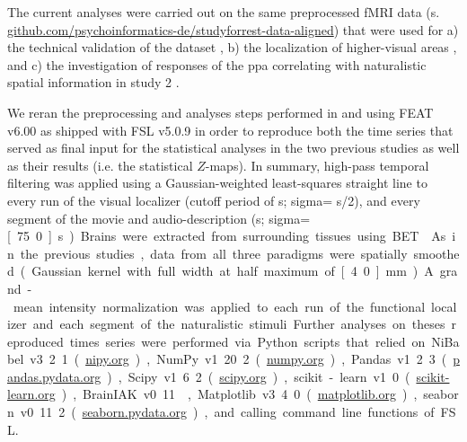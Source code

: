 The current analyses were carried out on the same preprocessed fMRI data (s.
\href{https://github.com/psychoinformatics-de/studyforrest-data-aligned
}{\url{github.com/psychoinformatics-de/studyforrest-data-aligned}}) that were
used for
%
a) the technical validation of the dataset \citep{hanke2016simultaneous},
%
b) the localization of higher-visual areas \citep{sengupta2016extension}, and
%
c) the investigation of responses of the \ac{ppa} correlating with naturalistic
spatial information in study 2 \citep{haeusler2022processing}.

%
We reran the preprocessing and analyses steps performed in
\citet{sengupta2016extension} and \citet{haeusler2022processing} using FEAT
v6.00 \citep[FMRI Expert Analysis Tool;][]{woolrich2001autocorr} as shipped with
FSL v5.0.9 \citep[\href{https://www.fmrib.ox.ac.uk/fsl}{FMRIB's Software
Library;}][]{smith2004fsl} in order to reproduce both the time series that
served as final input for the statistical analyses in the two previous studies
as well as their results (i.e. the statistical $Z$-maps).
In summary, high-pass temporal filtering was applied using a Gaussian-weighted
least-squares straight line to every run of the visual localizer (cutoff period
of \unit[100]{s}; sigma= \unit[100]{s}/2), and every segment of the
movie and audio-description (\unit[150]{s}; sigma=\unit[75.0]{s}).
Brains were extracted from surrounding tissues using BET \citep{smith2002bet}.
As in the previous studies, data from all three paradigms were spatially
smoothed (Gaussian kernel with full width at half maximum of \unit[4.0]{mm}).
A grand-mean intensity normalization was applied to each run of the functional
localizer and each segment of the naturalistic stimuli.

%
Further analyses on theses reproduced times series were performed via Python
scripts that relied on
%
NiBabel v3.2.1 (\href{https://nipy.org}{\url{nipy.org}}),
%
NumPy v1.20.2 (\href{https://numpy.org}{\url{numpy.org}}),
%
Pandas v1.2.3 (\href{https://pandas.pydata.org}{\url{pandas.pydata.org}}),
%
Scipy v1.6.2 (\href{https://scipy.org}{\url{scipy.org}}),
%
scikit-learn v1.0 (\href{https://scikit-learn.org}{\url{scikit-learn.org}}),
%
BrainIAK v0.11
\citep[\href{https://brainiak.org}{\url{brainiak.org}}][]{kumar2020brainiak,
kumar2020brainiaktutorial},
%
Matplotlib v3.4.0 (\href{https://matplotlib.org}{\url{matplotlib.org}}),
%
seaborn v0.11.2 (\href{https://seaborn.pydata.org}{\url{seaborn.pydata.org}}),
%
and calling command line functions of FSL.

